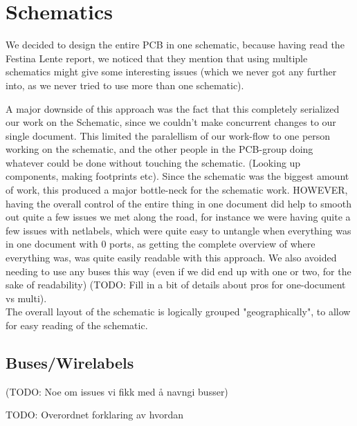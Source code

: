 \section {Schematics}

We decided to design the entire PCB in one schematic, because having read
the Festina Lente report, we noticed that they mention that using multiple schematics
might give some interesting issues (which we never got any further into,
as we never tried to use more than one schematic).

A major downside of this approach was the fact that this completely serialized our
work on the Schematic, since we couldn't make concurrent changes to our single document.
This limited the paralellism of our work-flow to one person working on the schematic,
and the other people in the PCB-group doing whatever could be done without touching the schematic.
(Looking up components, making footprints etc). Since the schematic was the biggest amount
of work, this produced a major bottle-neck for the schematic work. HOWEVER, having the overall
control of the entire thing in one document did help to smooth out quite a few issues we met
along the road, for instance we were having quite a few issues with netlabels, which were quite
easy to untangle when everything was in one document with 0 ports, as getting the complete overview
of where everything was, was quite easily readable with this approach. We also avoided needing
to use any buses this way (even if we did end up with one or two, for the sake of readability)
(TODO: Fill in a bit of details about pros for one-document vs multi). \\

The overall layout of the schematic is logically grouped "geographically", to
allow for easy reading of the schematic.

\subsection {Buses/Wirelabels}
(TODO: Noe om issues vi fikk med å navngi busser)

TODO: Overordnet forklaring av hvordan
